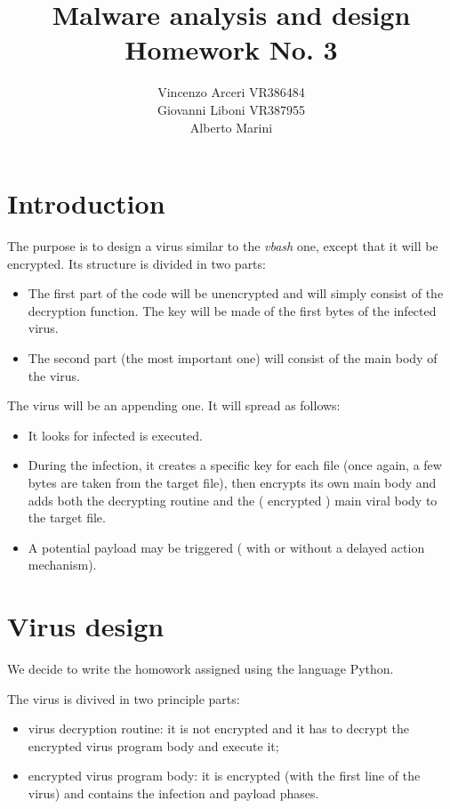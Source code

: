 \documentclass[a4paper,11pt]{article}
\begin{document}
\author{Vincenzo Arceri VR386484 \\ Giovanni Liboni VR387955 \\ Alberto Marini}
\title{Malware analysis and design \\ Homework No. 3}
\maketitle

\section{Introduction}
The purpose is to design a virus similar to the \textit{vbash} one, except that it will be encrypted. Its structure is divided in two parts:
\begin{itemize}
\item The first part of the code will be unencrypted and will simply consist of the decryption function. The key will be made of the first bytes of the infected virus.
\item The second part (the most important one) will consist of the main body of the virus.
\end{itemize}
The virus will be an appending one. It will spread as follows:
\begin{itemize}
\item It looks for infected is executed.
\item During the infection, it creates a specific key for each file (once again, a few bytes are taken from the target file), then encrypts its own main body and adds both the decrypting routine and the ( encrypted ) main viral body to the target file.
\item A potential payload may be triggered ( with or without a delayed action mechanism).
\end{itemize}

\section{Virus design}
We decide to write the homowork assigned using the language Python.

The virus is divived in two principle parts:
\begin{itemize}
\item virus decryption routine: it is not encrypted and it has to decrypt the encrypted virus program body and execute it;
\item encrypted virus program body: it is encrypted (with the first line of the virus) and contains the infection and payload phases.
\end{itemize}
\end{document}
